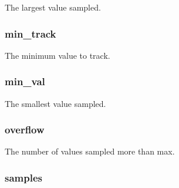 \label{classStats_1_1DistStor_a9791349c8134f44e46aa7688b0a9e92b}
The largest value sampled. \hypertarget{classStats_1_1DistStor_aa555699f5f2296783768934f45a2aa2f}{
\subsubsection[{min\_\-track}]{ {\bf min\_\-track}}}
\label{classStats_1_1DistStor_aa555699f5f2296783768934f45a2aa2f}
The minimum value to track. \hypertarget{classStats_1_1DistStor_a99ee5c8f5894036e88e7d30de9fa4211}{
\subsubsection[{min\_\-val}]{ {\bf min\_\-val}}}
\label{classStats_1_1DistStor_a99ee5c8f5894036e88e7d30de9fa4211}
The smallest value sampled. \hypertarget{classStats_1_1DistStor_a25f45345808703e64848f43dd7aa9ee7}{
\subsubsection[{overflow}]{ {\bf overflow}}}
\label{classStats_1_1DistStor_a25f45345808703e64848f43dd7aa9ee7}
The number of values sampled more than max. \hypertarget{classStats_1_1DistStor_ab4db99aba3dd28686061dd3d5475b3bd}{
\subsubsection[{samples}]{ {\bf samples}}}
\label{classStats_1_1DistStor_ab4db99aba3dd28686061dd3d5475b3bd}

